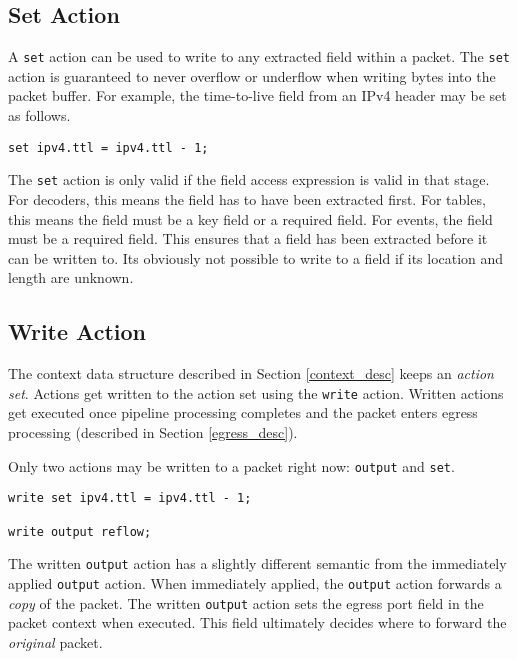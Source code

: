 \subsection{Set Action} \label{tut:set_action}

A \texttt{set} action can be used to write to any extracted field within a
packet. 
The \texttt{set} action is guaranteed to never overflow or underflow when
writing bytes into the packet buffer.
For example, the time-to-live field from an IPv4 header may be set as
follows.

\begin{codepage}
\begin{lstlisting}
set ipv4.ttl = ipv4.ttl - 1;
\end{lstlisting}
\end{codepage}

The \texttt{set} action is only valid if the field access expression is valid in
that stage. For decoders, this means the field has to have been extracted first.
For tables, this means the field must be a key field or a required field. For
events, the field must be a required field. This ensures that a field
has been extracted before it can be written to. Its obviously not possible
to write to a field if its location and length are unknown.

\subsection{Write Action} \label{tut:write_action}

The context data structure described in Section \ref{context_desc} keeps an
\textit{action set}. Actions get written to the action set using the
\texttt{write} action. Written actions get executed once pipeline processing
completes and the packet enters egress processing (described in Section \ref{egress_desc}).

Only two actions may be written to a packet right now: \texttt{output} and \texttt{set}.

\begin{lstlisting}
write set ipv4.ttl = ipv4.ttl - 1;

write output reflow;
\end{lstlisting}

The written \texttt{output} action has a slightly different semantic from the immediately
applied \texttt{output} action. When immediately applied, the \texttt{output} action forwards a
\textit{copy} of the packet. The written \texttt{output} action sets the egress port field
in the packet context when executed. This field ultimately decides where to forward the
\textit{original} packet.


